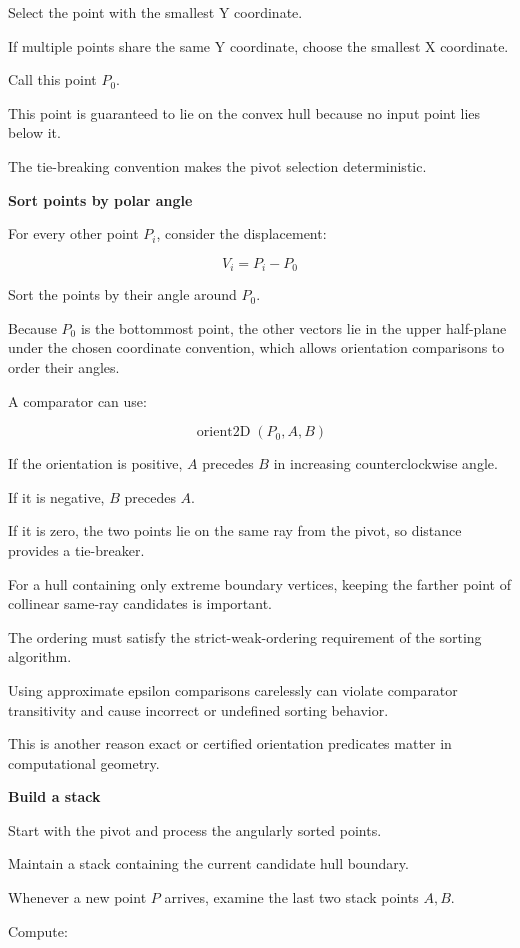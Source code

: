 Select the point with the smallest Y coordinate.

If multiple points share the same Y coordinate, choose the smallest X coordinate.

Call this point \(P_0\).

This point is guaranteed to lie on the convex hull because no input point lies below it.

The tie-breaking convention makes the pivot selection deterministic.

\textbf{Sort points by polar angle}

For every other point \(P_i\), consider the displacement:

\[
V_i=P_i-P_0
\]

Sort the points by their angle around \(P_0\).

Because \(P_0\) is the bottommost point, the other vectors lie in the upper half-plane under the chosen coordinate convention, which allows orientation comparisons to order their angles.

A comparator can use:

\[
\operatorname{orient2D}(P_0,A,B)
\]

If the orientation is positive, \(A\) precedes \(B\) in increasing counterclockwise angle.

If it is negative, \(B\) precedes \(A\).

If it is zero, the two points lie on the same ray from the pivot, so distance provides a tie-breaker.

For a hull containing only extreme boundary vertices, keeping the farther point of collinear same-ray candidates is important.

The ordering must satisfy the strict-weak-ordering requirement of the sorting algorithm.

Using approximate epsilon comparisons carelessly can violate comparator transitivity and cause incorrect or undefined sorting behavior.

This is another reason exact or certified orientation predicates matter in computational geometry.

\textbf{Build a stack}

Start with the pivot and process the angularly sorted points.

Maintain a stack containing the current candidate hull boundary.

Whenever a new point \(P\) arrives, examine the last two stack points \(A,B\).

Compute:

